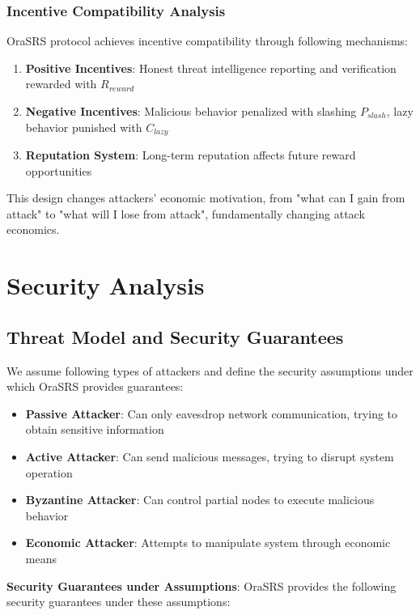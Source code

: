 \documentclass[12pt]{article}
\begin{document}
\subsubsection{Incentive Compatibility Analysis}

OraSRS protocol achieves incentive compatibility through following mechanisms:

\begin{enumerate}
\item \textbf{Positive Incentives}: Honest threat intelligence reporting and verification rewarded with $R_{reward}$
\item \textbf{Negative Incentives}: Malicious behavior penalized with slashing $P_{slash}$, lazy behavior punished with $C_{lazy}$
\item \textbf{Reputation System}: Long-term reputation affects future reward opportunities
\end{enumerate}

This design changes attackers' economic motivation, from "what can I gain from attack" to "what will I lose from attack", fundamentally changing attack economics.

\section{Security Analysis}

\subsection{Threat Model and Security Guarantees}

We assume following types of attackers and define the security assumptions under which OraSRS provides guarantees:

\begin{itemize}
\item \textbf{Passive Attacker}: Can only eavesdrop network communication, trying to obtain sensitive information
\item \textbf{Active Attacker}: Can send malicious messages, trying to disrupt system operation
\item \textbf{Byzantine Attacker}: Can control partial nodes to execute malicious behavior
\item \textbf{Economic Attacker}: Attempts to manipulate system through economic means
\end{itemize}

\textbf{Security Guarantees under Assumptions}:
OraSRS provides the following security guarantees under these assumptions:
\end{document}
